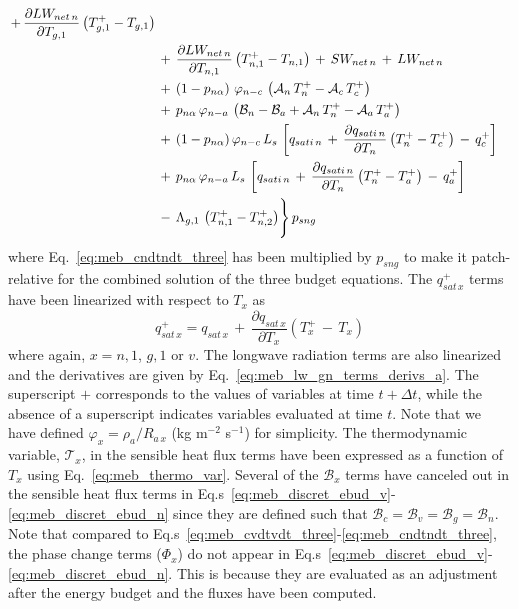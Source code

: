 {\begin{align}
\begin{split}
\,+\, {\frac{\partial LW_{net\,{n}}}{\partial T_{g,1}}}\left(T_{g,1}^+-T_{g,1}\right)
\\
&
\,+\, {\frac{\partial LW_{net\,{n}}}{\partial T_{n,1}}}\left(T_{n,1}^+-T_{n,1}\right)
\,+\, SW_{net\,n} \,+\, LW_{net\,n} 
\\
&
\,+\, \left(1-p_{n\alpha} \right)\,
\varphi_{n-c} \, \left( {\cal A}_n \, T_n^+ - {\cal A}_c \, T_c^+ \right)
\\
&
\,+\, p_{n\alpha}\,
\varphi_{n-a} \, \left( {\cal B}_n - {\cal B}_a + {\cal A}_n \, T_n^+ - {\cal A}_a \, T_a^+ \right)
\\
&
\,+\, 
\left(1-p_{n\alpha}\right)
\varphi_{n-c} \, L_s \,
\left[ q_{sati\,n} \,+\, {\frac{\partial q_{sati\,n}}{\partial T_n}}
\left(T_n^+-T_c^+ \right) \,-\, q_c^+ \right]
\\
&
\,+\, 
p_{n\alpha}\,
\varphi_{n-a} \, L_s \,
\left[ q_{sati\,n} \,+\, {\frac{\partial q_{sati\,n}}{\partial T_n}}
\left(T_n^+-T_a^+ \right) \,-\, q_a^+ \right]
\\
&
\,-\,
\Lambda_{g,1}\,\left( T_{n,1}^+ - T_{n,2}^+ \right)
\Biggr\rbrace \, p_{sng}
\end{split}
%
\end{align}
%
where Eq.~\ref{eq:meb_cndtndt_three} has been multiplied by $p_{sng}$ to make
it patch-relative for the combined solution of the three budget equations.
The $q_{sat\,x}^+$ terms have been linearized
with respect to $T_x$ as
%
\begin{equation}
q_{sat\,x}^+ = q_{sat\,x} \,+\, \frac{\partial q_{sat\,x}}{\partial T_x}\left(T_x^+ \,-\, T_x \right)
\end{equation}
%
where again, $x=n,1$, $g,1$ or $v$.
The longwave
radiation terms are also linearized and the derivatives 
are given by Eq.~\ref{eq:meb_lw_gn_terms_derivs_a}.
The superscript $+$ corresponds to the values of variables at time
$t+\Delta t$, while the absence of a superscript indicates variables
evaluated at time $t$.
Note that we have defined $\varphi_x=\rho_a/R_{a\,x}$ (kg m$^{-2}$ s$^{-1}$) for simplicity.
The thermodynamic variable, ${\mathcal{T}}_x$, in the sensible heat flux
terms have been expressed as a function of $T_x$
using Eq.~\ref{eq:meb_thermo_var}.
Several of the ${\mathcal B}_x$ terms have canceled out in the sensible heat flux
terms in 
Eq.s~\ref{eq:meb_discret_ebud_v}-\ref{eq:meb_discret_ebud_n} since they are defined such that 
${\mathcal B}_c={\mathcal B}_v={\mathcal B}_g={\mathcal B}_n$.
%
Note that compared to 
Eq.s~\ref{eq:meb_cvdtvdt_three}-\ref{eq:meb_cndtndt_three}, 
the phase change terms ($\Phi_x$)
do not appear in
Eq.s~\ref{eq:meb_discret_ebud_v}-\ref{eq:meb_discret_ebud_n}. 
This is because they are evaluated as an adjustment 
after the energy budget and the fluxes have been computed.

}
